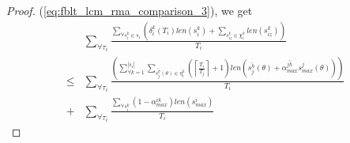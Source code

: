 \documentclass[12pt,english]{report}
\newtheorem{proof}{Proof}
\begin{document}
\begin{proof}
(\ref{eq:fblt_lcm_rma_comparison_3}), we get 
\begin{eqnarray}
 & \sum_{\forall\tau_{i}}\frac{\sum_{\forall s_{i}^{k}\in s_{i}}\left(\delta_{i}^{k}(T_{i})len(s_{i}^{k})+\sum_{s_{iz}^{k}\in\chi_{i}^{k}}len(s_{iz}^{k})\right)}{T_{i}}\label{eq:fblt_lcm_rma_comparison_4}\\
\le & \sum_{\forall\tau_{i}}\frac{\left(\sum_{\forall k=1}^{|s_{i}|}\sum_{\bar{s_{j}^{h}}(\theta)\in\eta_{i}^{k}}\left(\left\lceil \frac{T_{i}}{T_{j}}\right\rceil +1\right)len\left(\bar{s_{j}^{h}}(\theta)+\bar{\alpha_{max}^{jh}}s_{max}^{j}(\theta)\right)\right)}{T_{i}}\nonumber \\
+ & \sum_{\forall\tau_{i}}\frac{\sum_{\forall s_{i}^{k}}\left(1-\alpha_{max}^{ik}\right)len(s_{max}^{i})}{T_{i}}\nonumber 
\end{eqnarray}



\end{proof}
\end{document}
